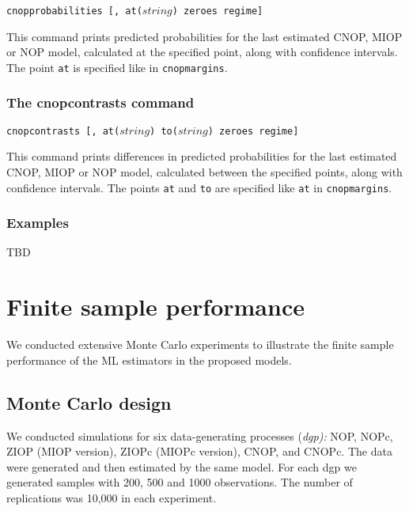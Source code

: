 \documentclass[letterpaper,fleqn,11pt]{article}
\begin{document}
\texttt{cnopprobabilities [, at($string$) zeroes regime]}

This command prints predicted probabilities for the last estimated CNOP,
MIOP or NOP model, calculated at the specified point, along with confidence
intervals. The point \texttt{at} is specified like in \texttt{cnopmargins}.

\subsubsection*{The cnopcontrasts command}

\texttt{cnopcontrasts [, at($string$) to($string$) zeroes regime] }

This command prints differences in predicted probabilities for the last
estimated CNOP, MIOP or NOP model, calculated between the specified points,
along with confidence intervals. The points \texttt{at} and \texttt{to} are
specified like \texttt{at} in \texttt{cnopmargins}.

\subsubsection*{Examples}

TBD

\section{Finite sample performance}

We conducted extensive Monte Carlo experiments to illustrate the finite
sample performance of the ML estimators in the proposed models.

\subsection*{Monte Carlo design}

We conducted simulations for six data-generating processes (\textit{dgp):}
NOP, NOPc, ZIOP (MIOP version), ZIOPc (MIOPc version), CNOP, and CNOPc. The
data were generated and then estimated by the same model. For each dgp we
generated samples with 200, 500 and 1000 observations. The number of
replications was 10,000 in each experiment.
\end{document}
